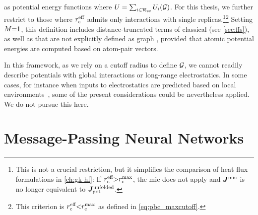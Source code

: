  as potential energy functions where $U = 
\sum_{i \in \mathcal{R_{\text{sc}}}}\nolimits U_i(\mathcal{G})$. For this thesis, we further restrict \glps to those where $r_{\text{c}}^{\text{eff}}$ admits only interactions with single replicas.\footnote{This is not a crucial restriction, but it simplifies the comparison of heat flux formulations in \cref{ch:gk-hf}: If $r_{\text{c}}^{\text{eff}}{>}r_{\text{c}}^{\text{max}}$, the \gls{mic} does not apply and $\boldsymbol{J}^{\text{mic}}$ is no longer equivalent to $\boldsymbol{J}^{\text{unfolded}}_\text{pot}$.}\footnote{This criterion is $r_{\text{c}}^{\text{eff}}{<}r_{\text{c}}^{\text{max}}$ as defined in \cref{eq:pbc_maxcutoff}.}
Setting $M{=}1$, this definition includes distance-truncated terms of classical \ffs (see \cref{sec:ffs}), as well as \mlps that are not explicitly defined as graph \nns, provided that atomic potential energies are computed based on atom-pair vectors.

In this framework, as we rely on a cutoff radius to define $\mathcal{G}$, we cannot readily describe potentials with global interactions or long-range electrostatics.
In some cases, for instance when inputs to electrostatics are predicted based on local environments~\cite{msb2012q,b2021q}, some of the present considerations could be nevertheless applied. We do not pursue this here.

\section{Message-Passing Neural Networks}

